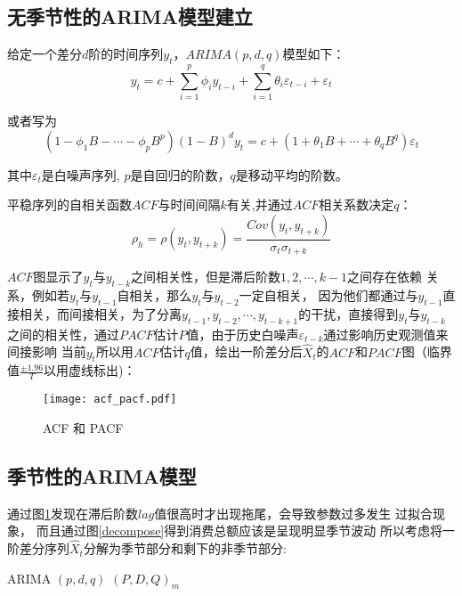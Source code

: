 \documentclass[12pt,a4paper]{nmmcm}
\begin{document}
\subsection{无季节性的ARIMA模型建立}
给定一个差分\(d\)阶的时间序列\(y_t\)，\(ARIMA(p,d,q)\)模型如下：
\begin{equation}
  y_t=c+\sum_{i=1}^p{\phi_i y_{t-i}}+\sum_{i=1}^q{\theta_i\varepsilon_{t-i}}+\varepsilon_t
\end{equation}

或者写为\cite{Rob} \[(1-\phi_1B - \cdots - \phi_p B^p)  (1-B)^d y_{t} = c + (1 + \theta_1 B + \cdots + \theta_q B^q)\varepsilon_t\]

其中\(\varepsilon_t\)是白噪声序列, \(p\)是自回归的阶数，\(q\)是移动平均的阶数。

平稳序列的自相关函数\(ACF\)与时间间隔\(k\)有关,并通过\(ACF\)相关系数决定\(q\)：
\begin{equation}
  \rho_h = \rho(y_t,y_{t+k}) =\frac{Cov(y_t,y_{t+k})}{\sigma_t \sigma_{t+k}}
\end{equation}

\(ACF\)图显示了\(y_t\)与\(y_{t-k}\)之间相关性，但是滞后阶数\(1,2,\cdots,k-1\)之间存在依赖
关系\cite{Rob}，例如若\(y_t\)与\(y_{t-1}\)自相关，那么\(y_t\)与\(y_{t-2}\)一定自相关，
因为他们都通过与\(y_{t-1}\)直接相关，而间接相关，为了分离\(y_{t-1},
y_{t-2},\cdots,y_{t-k+1}\)的干扰，直接得到\(y_t\)与\(y_{t-k}\)之间的相关性，通过\(PACF\)估计\(P\)值，由于历史白噪声\(\varepsilon_{t-k}\)通过影响历史观测值来间接影响
当前\(y_t\)所以用\(ACF\)估计\(q\)值，绘出一阶差分后\(\hat{X}_t\)的\(ACF\)和\(PACF\)图（临界值\(\frac{\pm1.96}{T}\)以用虚线标出)：
\begin{figure}[H] %
  \centering %
  \texttt{[image: acf\_pacf.pdf]} %
  \caption{ACF 和 PACF} %
  \label{acf_pacf} %
  \end{figure} 
  \subsection{季节性的ARIMA模型}
  通过图\ref{acf_pacf}发现在滞后阶数\(lag\)值很高时才出现拖尾，会导致参数过多发生
  过拟合现象， 而且通过图\ref{decompose}得到消费总额应该是呈现明显季节波动
  所以考虑将一阶差分序列\(\hat{X}_t\)分解为季节部分和剩下的非季节部分\cite{Rob}:
\begin{center}
  ARIMA\;\;\;\;	\((p, d, q)\)	\;\;\;\;\; \((P, D, Q)_{m}\) \label{Season_decompose}
\end{center}
\end{document}
